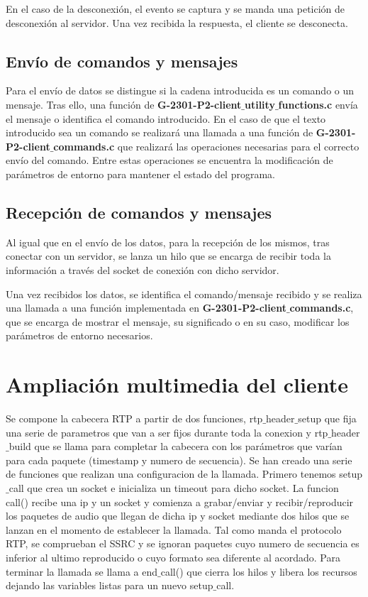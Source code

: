 \documentclass{mathnotes}
\begin{document}
En el caso de la desconexión, el evento se captura y se manda una petición de desconexión al servidor. Una vez recibida la respuesta, el cliente se desconecta.

\subsection{Envío de comandos y mensajes}
Para el envío de datos se distingue si la cadena introducida es un comando o un mensaje.
Tras ello, una función de \textbf{G-2301-P2-client$\_$utility$\_$functions.c} envía el mensaje o identifica el comando introducido. En el caso de que el texto introducido sea un comando se realizará una llamada a una función de \textbf{G-2301-P2-client$\_$commands.c} que realizará las operaciones necesarias para el correcto envío del comando. Entre estas operaciones se encuentra la modificación de parámetros de entorno para mantener el estado del programa.

\subsection{Recepción de comandos y mensajes}
Al igual que en el envío de los datos, para la recepción de los mismos, tras conectar con un servidor, se lanza un hilo que se encarga de recibir toda la información a través del socket de conexión con dicho servidor.

Una vez recibidos los datos, se identifica el comando/mensaje recibido y se realiza una llamada a una función implementada en \textbf{G-2301-P2-client$\_$commands.c}, que se encarga de mostrar el mensaje, su significado o en su caso, modificar los parámetros de entorno necesarios.

\section{Ampliación multimedia del cliente}
Se compone la cabecera RTP a partir de dos funciones, rtp$\_$header$\_$setup que fija una serie de parametros que van a ser fijos durante toda la conexion y rtp$\_$header$\_$build que se llama para completar la cabecera con los parámetros que varían para cada paquete (timestamp y numero de secuencia).
Se han creado una serie de funciones que realizan una configuracion de la llamada.
Primero tenemos setup$\_$call que crea un socket e inicializa un timeout para dicho socket.
La funcion call() recibe una ip y un socket y comienza a grabar/enviar y recibir/reproducir los paquetes de audio que llegan de dicha ip y socket mediante dos hilos que se lanzan en el momento de establecer la llamada.
Tal como manda el protocolo RTP, se comprueban el SSRC y se ignoran paquetes cuyo numero de secuencia es inferior al ultimo reproducido o cuyo formato sea diferente al acordado.
Para terminar la llamada se llama a end$\_$call() que cierra los  hilos y libera los recursos dejando las variables listas para  un nuevo setup$\_$call.
\end{document}
